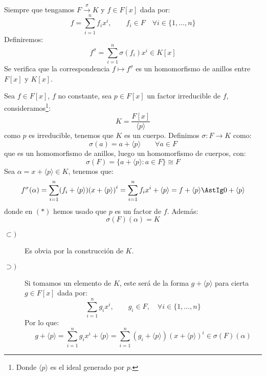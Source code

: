 \begin{definicion}
    Siempre que tengamos $F\stackrel{\sigma}{\to} K$ y $f\in F[x]$ dada por:
\begin{equation*}
    f = \sum_{i=1}^{n} f_i x^i, \qquad f_i \in F \quad \forall i \in \{1,\ldots,n\}
\end{equation*}
Definiremos:
\begin{equation*}
    f^\sigma = \sum_{i=1}^{n} \sigma(f_i) x^i \in K[x]
\end{equation*}
Se verifica que la correspondencia $f\mapsto f^\sigma$ es un homomorfismo de anillos entre $F[x]$ y $K[x]$.
\end{definicion}

\begin{ejemplo}
    Sea $f\in F[x]$, $f$ no constante, sea $p\in F[x]$ un factor irreducible de $f$, consideramos\footnote{Donde $\langle p \rangle $ es el ideal generado por $p$.}:
    \begin{equation*}
        K = \dfrac{F[x]}{\langle p \rangle }
    \end{equation*}
    como $p$ es irreducible, tenemos que $K$ es un cuerpo. Definimos $\sigma:F\to K$ como:
    \begin{equation*}
        \sigma(a) = a + \langle p \rangle  \qquad \forall a\in F
    \end{equation*}
    que es un homomorfismo de anillos, luego un homomorfismo de cuerpos, con:
    \begin{equation*}
        \sigma(F) = \{a+\langle p \rangle : a\in F\} \cong F
    \end{equation*}
    Sea $\alpha = x+\langle p \rangle \in K$, tenemos que:
    \begin{equation*}
        f^\sigma(\alpha) = \sum_{i=1}^{n} (f_i + \langle p \rangle){(x+\langle p \rangle )}^{i} = \sum_{i=1}^{n} f_ix^i + \langle p \rangle  = f + \langle p \rangle  \AstIg 0 + \langle p \rangle 
    \end{equation*}
    donde en $(\ast)$ hemos usado que $p$ es un factor de $f$. Además:
    \begin{equation*}
        \sigma(F)(\alpha) = K
    \end{equation*}
    \begin{description}
        \item [$\subset )$] Es obvia por la construcción de $K$.
        \item [$\supset )$] Si tomamos un elemento de $K$, este será de la forma $g+\langle p \rangle $ para cierta $g\in F[x]$ dada por:
            \begin{equation*}
                \sum_{i=1}^{n}g_ix^i, \qquad g_i \in F, \quad \forall i \in \{1,\ldots,n\}
            \end{equation*}
            Por lo que:
            \begin{equation*}
                g+\langle p \rangle  = \sum_{i=1}^{n}g_ix^i + \langle p \rangle  = \sum_{i=1}^{n}(g_i+\langle p \rangle ){(x+\langle p \rangle )}^{i} \in \sigma(F)(\alpha)
            \end{equation*}
    \end{description}
\end{ejemplo}

